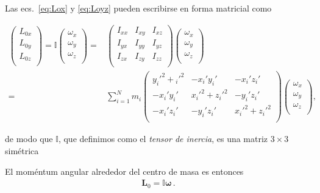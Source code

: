 Las ecs.~\eqref{eq:Lox} y \eqref{eq:Loyz} pueden escribirse en forma
matricial como
\begin{frame}
\begin{align}
  \begin{pmatrix}
    L_{0x}\\
    L_{0y}\\
    L_{0z}\\
  \end{pmatrix}=\mathbb{I}
  \begin{pmatrix}
    \omega_x\\
    \omega_y\\
    \omega_z\\
  \end{pmatrix}=&
  \begin{pmatrix}
    I_{xx}&I_{xy}&I_{xz}\\
    I_{yx}&I_{yy}&I_{yz}\\
    I_{zx}&I_{zy}&I_{zz}\\
  \end{pmatrix}
  \begin{pmatrix}
     \omega_x\\    
     \omega_y\\    
     \omega_z\\    
  \end{pmatrix}\nonumber\\
   =&
  \sum_{i=1}^Nm_i\begin{pmatrix}
    {y_i'}^2+{_i'}^2&-x_i'y_i'        &-x_i'z_i'\\
    -x_i'y_i'       &{x_i'}^2+{z_i'}^2&-y_i'z_i'\\
    -x_i'z_i'       &-y_i'z_i'       &{x_i'}^2+{z_i'}^2\\
  \end{pmatrix}
  \begin{pmatrix}
     \omega_x\\    
     \omega_y\\    
     \omega_z\\    
  \end{pmatrix},
\end{align}
\end{frame}
de modo que $\mathbb{I}$, que definimos como el \emph{tensor de
  inercia}, es una matriz $3\times 3$ simétrica 


El moméntum angular alrededor del centro de masa es entonces
\begin{align}
  \mathbf{L}_0=\mathbb{I}\boldsymbol{\omega}\,.
\end{align}

